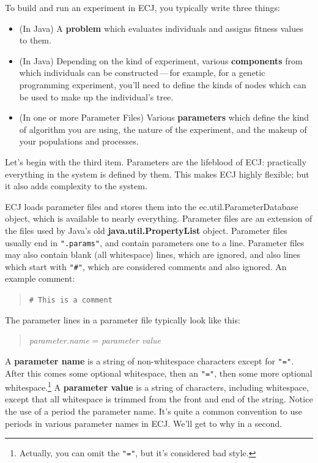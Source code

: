 \documentclass[twoside,10pt]{book}
\newcommand\class[1]{\index{#1}\textsf{#1}}
\newcommand\character[1]{\texttt{"{#1}"}}
\newcommand\textstr[1]{\texttt{"{#1}"}}
\begin{document}
To build and run an experiment in ECJ, you typically write three things:

\begin{itemize}
\item (In Java) A {\bf problem} which evaluates individuals and assigns fitness values to them.
\item (In Java) Depending on the kind of experiment, various {\bf components} from which individuals can be constructed\,---\,for example, for a genetic programming experiment, you'll need to define the kinds of nodes which can be used to make up the individual's tree.
\item (In one or more Parameter Files) Various {\bf parameters} which define the kind of algorithm you are using, the nature of the experiment, and the makeup of your populations and processes.
\end{itemize}

Let's begin with the third item.  Parameters are the lifeblood of ECJ: practically everything in the system is defined by them.  This makes ECJ highly flexible; but it also adds complexity to the system.

ECJ loads parameter files and stores them into the \class{ec.util.ParameterDatabase} object, which is available to nearly everything.  Parameter files are an extension of the files used by Java's old {\bf java.util.PropertyList} object.  Parameter files usually end in \textstr{.params}, and contain parameters one to a line.  Parameter files may also contain blank (all whitespace) lines, which are ignored, and also lines which start with \character{\#}, which are considered comments and also ignored.  An example comment:
\begin{quote}
\texttt{\# This is a comment}
\end{quote}

The parameter lines in a parameter file typically look like this:
\begin{quote}
{\it parameter.name} = {\it parameter value}
\end{quote}

A {\bf parameter name} is a string of non-whitespace characters except for \character{=}.  After this comes some optional whitespace, then an \character{=}, then some more optional whitespace.\footnote{Actually, you can omit the \character{=}, but it's considered bad style.}  A {\bf parameter value} is a string of characters, including whitespace, except that all whitespace is trimmed from the front and end of the string.  Notice the use of a period the parameter name.  It's quite a common convention to use periods in various parameter names in ECJ. We'll get to why in a second.
\end{document}
